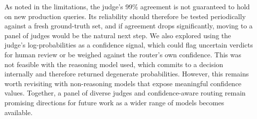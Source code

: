 As noted in the limitations, the judge's 99\% agreement is not guaranteed to hold on new production queries. Its reliability should therefore be tested periodically against a fresh ground-truth set, and if agreement drops significantly, moving to a panel of judges would be the natural next step. We also explored using the judge's log-probabilities as a confidence signal, which could flag uncertain verdicts for human review or be weighed against the router's own confidence. This was not feasible with the reasoning model used, which commits to a decision internally and therefore returned degenerate probabilities. However, this remains worth revisiting with non-reasoning models that expose meaningful confidence values. Together, a panel of diverse judges and confidence-aware routing remain promising directions for future work as a wider range of models becomes available.
